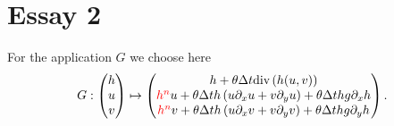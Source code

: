 \documentclass[a4paper, 11pt]{article}
\begin{document}
\section{Essay 2}
For the application $G$ we choose here
\begin{equation*}
G:\begin{pmatrix}h\\u\\v\end{pmatrix}\mapsto\begin{pmatrix}h+\theta\Delta t\text{div}\left(h(u,v)\right)\\
\textcolor{red}{h^n}u+\theta\Delta t h\left(u\partial_xu+v\partial_yu\right)+\theta \Delta thg\partial_x h\\
\textcolor{red}{h^n}v+\theta\Delta t h\left(u\partial_xv+v\partial_yv\right)+\theta \Delta thg\partial_y h
\end{pmatrix}.
\end{equation*}
\end{document}
